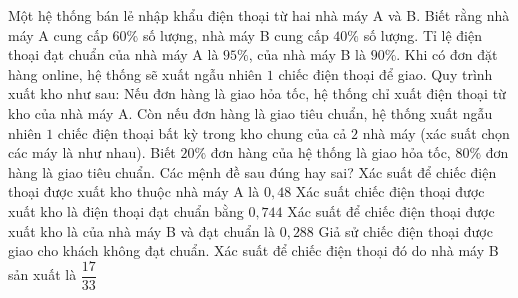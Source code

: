 \begin{ex} %
	Một hệ thống bán lẻ nhập khẩu điện thoại từ hai nhà máy A và B. Biết rằng nhà máy A cung cấp $60\%$ số lượng, nhà máy B cung cấp $40\%$ số lượng. Tỉ lệ điện thoại đạt chuẩn của nhà máy A là $95\%$, của nhà máy B là $90\%$.
	Khi có đơn đặt hàng online, hệ thống sẽ xuất ngẫu nhiên $1$ chiếc điện thoại để giao. Quy trình xuất kho như sau: Nếu đơn hàng là giao hỏa tốc, hệ thống chỉ xuất điện thoại từ kho của nhà máy A. Còn nếu đơn hàng là giao tiêu chuẩn, hệ thống xuất ngẫu nhiên $1$ chiếc điện thoại bất kỳ trong kho chung của cả $2$ nhà máy (xác suất chọn các máy là như nhau). Biết $20\%$ đơn hàng của hệ thống là giao hỏa tốc, $80\%$ đơn hàng là giao tiêu chuẩn.
	Các mệnh đề sau đúng hay sai?
	\choiceTF
	{Xác suất để chiếc điện thoại được xuất kho thuộc nhà máy A là $0,48$}
	{Xác suất chiếc điện thoại được xuất kho là điện thoại đạt chuẩn bằng $0,744$}
	{\True Xác suất để chiếc điện thoại được xuất kho là của nhà máy B và đạt chuẩn là $0,288$}
	{Giả sử chiếc điện thoại được giao cho khách không đạt chuẩn. Xác suất để chiếc điện thoại đó do nhà máy B sản xuất là $\dfrac{17}{33}$}
\end{ex}
